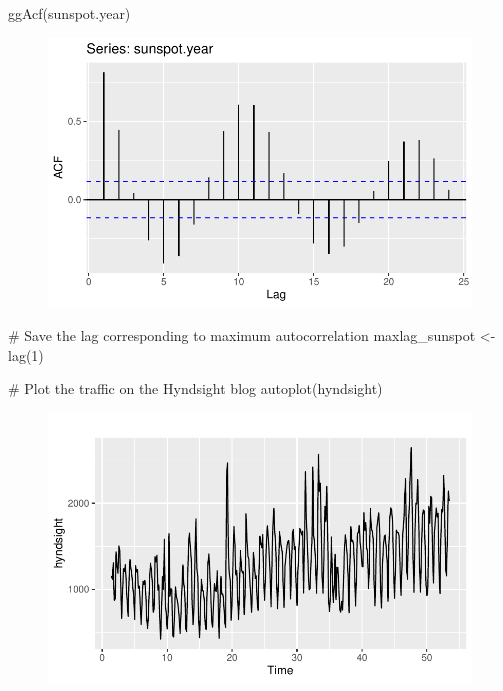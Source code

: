 \documentclass[
  letterpaper,
  DIV=11,
  numbers=noendperiod]{scrartcl}
\newenvironment{Shaded}{\begin{snugshade}}{\end{snugshade}}
\newcommand{\CommentTok}[1]{\textcolor[rgb]{0.37,0.37,0.37}{#1}}
\newcommand{\DecValTok}[1]{\textcolor[rgb]{0.68,0.00,0.00}{#1}}
\newcommand{\FunctionTok}[1]{\textcolor[rgb]{0.28,0.35,0.67}{#1}}
\newcommand{\NormalTok}[1]{\textcolor[rgb]{0.00,0.23,0.31}{#1}}
\newcommand{\OtherTok}[1]{\textcolor[rgb]{0.00,0.23,0.31}{#1}}
\begin{document}
\begin{Shaded}
\begin{Highlighting}[]
\FunctionTok{ggAcf}\NormalTok{(sunspot.year)}
\end{Highlighting}
\end{Shaded}

\begin{figure}[H]

{\centering \includegraphics{forecasting_datacamp_ex_files/figure-pdf/unnamed-chunk-5-2.pdf}

}

\end{figure}

\begin{Shaded}
\begin{Highlighting}[]
\CommentTok{\# Save the lag corresponding to maximum autocorrelation}
\NormalTok{maxlag\_sunspot }\OtherTok{\textless{}{-}} \FunctionTok{lag}\NormalTok{(}\DecValTok{1}\NormalTok{)}

\CommentTok{\# Plot the traffic on the Hyndsight blog}
\FunctionTok{autoplot}\NormalTok{(hyndsight)}
\end{Highlighting}
\end{Shaded}

\begin{figure}[H]

{\centering \includegraphics{forecasting_datacamp_ex_files/figure-pdf/unnamed-chunk-5-3.pdf}

}

\end{figure}
\end{document}
